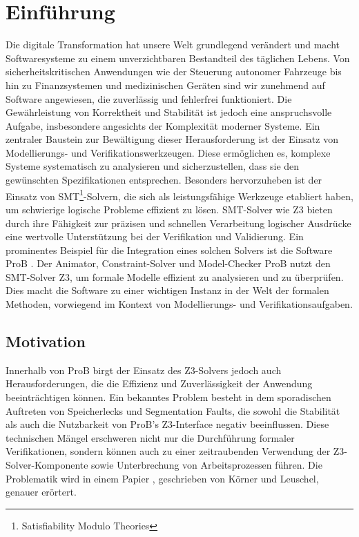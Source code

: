 

\section{Einführung}

Die digitale Transformation hat unsere Welt grundlegend verändert und macht Softwaresysteme zu einem unverzichtbaren Bestandteil des täglichen Lebens.
Von sicherheitskritischen Anwendungen wie der Steuerung autonomer Fahrzeuge bis hin zu Finanzsystemen und medizinischen Geräten sind wir zunehmend auf Software angewiesen,
die zuverlässig und fehlerfrei funktioniert.
Die Gewährleistung von Korrektheit und Stabilität ist jedoch eine anspruchsvolle Aufgabe,
insbesondere angesichts der Komplexität moderner Systeme.
Ein zentraler Baustein zur Bewältigung dieser Herausforderung ist der Einsatz von Modellierungs- und Verifikationswerkzeugen.
Diese ermöglichen es, komplexe Systeme systematisch zu analysieren und sicherzustellen,
dass sie den gewünschten Spezifikationen entsprechen.
Besonders hervorzuheben ist der Einsatz von SMT\footnote{Satisfiability Modulo Theories}-Solvern,
die sich als leistungsfähige Werkzeuge etabliert haben,
um schwierige logische Probleme effizient zu lösen.
SMT-Solver wie Z3 \cite{10.1007/978-3-540-78800-3_24} bieten durch ihre Fähigkeit zur präzisen und schnellen Verarbeitung logischer Ausdrücke eine wertvolle Unterstützung bei der Verifikation und Validierung.
Ein prominentes Beispiel für die Integration eines solchen Solvers ist die Software ProB \cite{leuschel2003prob}.
Der Animator, Constraint-Solver und Model-Checker ProB nutzt den SMT-Solver Z3, um formale Modelle effizient zu analysieren und zu überprüfen.
Dies macht die Software zu einer wichtigen Instanz in der Welt der formalen Methoden,
vorwiegend im Kontext von Modellierungs- und Verifikationsaufgaben.

\subsection{Motivation}

Innerhalb von ProB birgt der Einsatz des Z3-Solvers jedoch auch Herausforderungen, die die Effizienz und Zuverlässigkeit der Anwendung beeinträchtigen können.
Ein bekanntes Problem besteht in dem sporadischen Auftreten von Speicherlecks und Segmentation Faults,
die sowohl die Stabilität als auch die Nutzbarkeit von ProB's Z3-Interface negativ beeinflussen.
Diese technischen Mängel erschweren nicht nur die Durchführung formaler Verifikationen,
sondern können auch zu einer zeitraubenden Verwendung der Z3-Solver-Komponente sowie Unterbrechung von Arbeitsprozessen führen.
Die Problematik wird in einem Papier \cite{10.1007/978-3-031-25803-9_5}, geschrieben von Körner und Leuschel, genauer erörtert.

